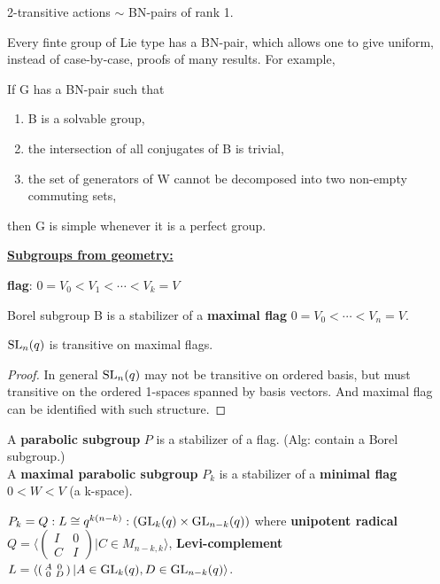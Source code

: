 \documentclass[a4paper,11pt]{article}
\begin{document}
\begin{example}
    2-transitive actions $\sim$ BN-pairs of rank 1.
\end{example}

Every finte group of Lie type has a BN-pair, which allows one to give uniform, instead of case-by-case, proofs of many results. For example,
\begin{theorem}
    If G has a BN-pair such that 
    \begin{enumerate}[itemsep=0pt,label=(\roman*)]
        \item B is a solvable group,
        \item the intersection of all conjugates of B is trivial,
        \item the set of generators of W cannot be decomposed into two non-empty commuting sets,
    \end{enumerate} then G is simple whenever it is a perfect group.
\end{theorem}

\noindent\textbf{\underline{Subgroups from geometry:}}

\begin{definition}
    \textbf{flag}: $0=V_0< V_1<\cdots<V_k=V$
\end{definition}

Borel subgroup B is a stabilizer of a \textbf{maximal flag} $0=V_0<\cdots <V_n=V$.

\begin{lemma}
    $\mathrm{SL}_n(q)$ is transitive on maximal flags.
\end{lemma}
\begin{proof}
    In general $\mathrm{SL}_n(q)$ may not be transitive on ordered basis, but must transitive on the ordered 1-spaces spanned by basis vectors. And maximal flag can be identified with such structure.
\end{proof}

\begin{definition}
    A \textbf{parabolic subgroup} $P$ is a stabilizer of a flag. (Alg: contain a Borel subgroup.)\\
    A \textbf{maximal parabolic subgroup} $P_k$ is a stabilizer of a \textbf{minimal flag} $0<W<V$ (a k-space).
\end{definition}

\begin{proposition}
    $P_k=Q:L\cong q^{k(n-k)}:(\mathrm{GL}_k(q)\times \mathrm{GL}_{n-k}(q))$ where \textbf{unipotent radical} $Q=\langle\left(\begin{smallmatrix}
        I & 0\\C & I
    \end{smallmatrix}\right)| C\in M_{n-k,k}\rangle$, \textbf{Levi-complement} $L=\langle\left(\begin{smallmatrix}
        A & 0\\0 & D
    \end{smallmatrix}\right)| A\in \mathrm{GL}_k(q), D\in \mathrm{GL}_{n-k}(q)\rangle$.
\end{proposition}
\end{document}
